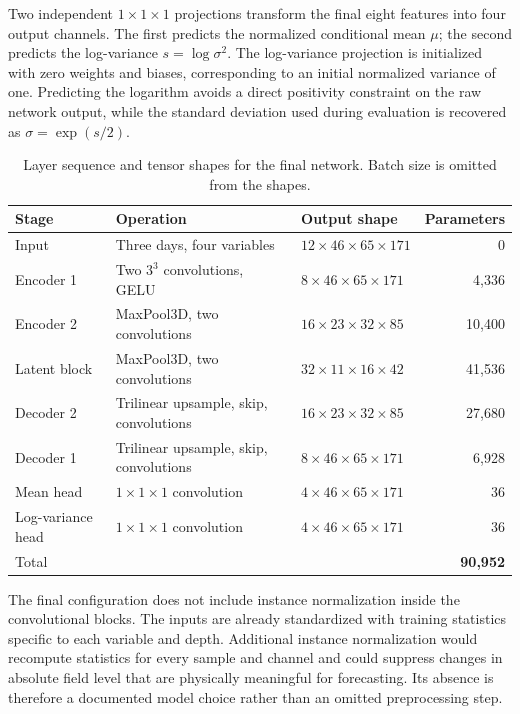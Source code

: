 Two independent $1\times1\times1$ projections transform the final eight features into four output channels. The first predicts the normalized conditional mean $\mu$; the second predicts the log-variance $s=\log\sigma^2$. The log-variance projection is initialized with zero weights and biases, corresponding to an initial normalized variance of one. Predicting the logarithm avoids a direct positivity constraint on the raw network output, while the standard deviation used during evaluation is recovered as $\sigma=\exp(s/2)$.

\begin{table}[htbp]
\centering
\small
\caption{Layer sequence and tensor shapes for the final network. Batch size is omitted from the shapes.}
\label{tab:architecture-layers}
\begin{tabular}{p{2.5cm}p{4.2cm}p{3.2cm}r}
\toprule
Stage & Operation & Output shape & Parameters \\
\midrule
Input & Three days, four variables & $12\times46\times65\times171$ & 0 \\
Encoder 1 & Two $3^3$ convolutions, GELU & $8\times46\times65\times171$ & 4,336 \\
Encoder 2 & MaxPool3D, two convolutions & $16\times23\times32\times85$ & 10,400 \\
Latent block & MaxPool3D, two convolutions & $32\times11\times16\times42$ & 41,536 \\
Decoder 2 & Trilinear upsample, skip, convolutions & $16\times23\times32\times85$ & 27,680 \\
Decoder 1 & Trilinear upsample, skip, convolutions & $8\times46\times65\times171$ & 6,928 \\
Mean head & $1\times1\times1$ convolution & $4\times46\times65\times171$ & 36 \\
Log-variance head & $1\times1\times1$ convolution & $4\times46\times65\times171$ & 36 \\
\midrule
Total & & & \textbf{90,952} \\
\bottomrule
\end{tabular}
\end{table}

The final configuration does not include instance normalization inside the convolutional blocks. The inputs are already standardized with training statistics specific to each variable and depth. Additional instance normalization would recompute statistics for every sample and channel and could suppress changes in absolute field level that are physically meaningful for forecasting. Its absence is therefore a documented model choice rather than an omitted preprocessing step.

